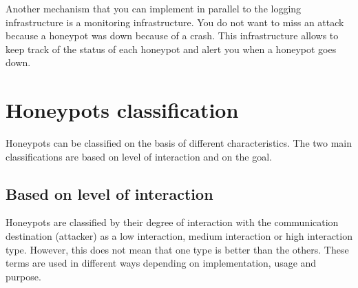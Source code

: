 \documentclass[epsfig,a4paper,11pt,titlepage,oneside,openany]{book}
\begin{document}
Another mechanism that you can implement in parallel to the logging infrastructure is a monitoring infrastructure. You do not want to miss an attack because a honeypot was down because of a crash. This infrastructure allows to keep track of the status of each honeypot and alert you when a honeypot goes down.

\chapter{Honeypots classification}

Honeypots can be classified on the basis of different characteristics. The two main classifications are based on level of interaction and on the goal.

\section{Based on level of interaction}

Honeypots are classified by their degree of interaction with the communication destination (attacker) as a low interaction, medium interaction or  high interaction type. However, this does not mean that one type is better than the others. These terms are used in different ways depending on implementation, usage and purpose.
\end{document}
